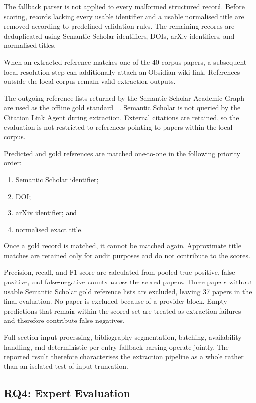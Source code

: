 \documentclass[runningheads]{llncs}
\begin{document}
The fallback parser is not applied to every malformed structured
record. Before scoring, records lacking every usable identifier and a
usable normalised title are removed according to predefined validation
rules. The remaining records are deduplicated using Semantic Scholar
identifiers, DOIs, arXiv identifiers, and normalised titles.

When an extracted reference matches one of the 40 corpus papers, a
subsequent local-resolution step can additionally attach an Obsidian
wiki-link. References outside the local corpus remain valid extraction
outputs.

The outgoing reference lists returned by the Semantic Scholar Academic
Graph are used as the offline gold standard
~\cite{kinney2023semantic}. Semantic Scholar is not queried by the
Citation Link Agent during extraction. External citations are retained,
so the evaluation is not restricted to references pointing to papers
within the local corpus.

Predicted and gold references are matched one-to-one in the following
priority order:

\begin{enumerate}
    \item Semantic Scholar identifier;
    \item DOI;
    \item arXiv identifier; and
    \item normalised exact title.
\end{enumerate}

Once a gold record is matched, it cannot be matched again. Approximate
title matches are retained only for audit purposes and do not contribute
to the scores.

Precision, recall, and F1-score are calculated from pooled
true-positive, false-positive, and false-negative counts across the
scored papers. Three papers without usable Semantic Scholar gold
reference lists are excluded, leaving 37 papers in the final
evaluation. No paper is excluded because of a provider block. Empty
predictions that remain within the scored set are treated as extraction
failures and therefore contribute false negatives.

Full-section input processing, bibliography segmentation, batching,
availability handling, and deterministic per-entry fallback parsing
operate jointly. The reported result therefore characterises the
extraction pipeline as a whole rather than an isolated test of input
truncation.

\subsection{RQ4: Expert Evaluation}
\label{sec:rq4_method}
\end{document}
